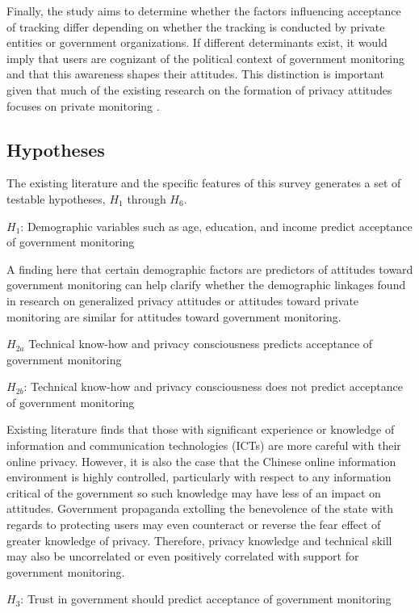 \documentclass[
  number]{elsarticle}
\begin{document}
Finally, the study aims to determine whether the factors influencing
acceptance of tracking differ depending on whether the tracking is
conducted by private entities or government organizations. If different
determinants exist, it would imply that users are cognizant of the
political context of government monitoring and that this awareness
shapes their attitudes. This distinction is important given that much of
the existing research on the formation of privacy attitudes focuses on
private monitoring \citep{gómez-barroso2018}.

\subsection{Hypotheses}\label{hypotheses}

The existing literature and the specific features of this survey
generates a set of testable hypotheses, \(H_1\) through \(H_6\).

\(H_1\): Demographic variables such as age, education, and income
predict acceptance of government monitoring

A finding here that certain demographic factors are predictors of
attitudes toward government monitoring can help clarify whether the
demographic linkages found in research on generalized privacy attitudes
or attitudes toward private monitoring are similar for attitudes toward
government monitoring.

\(H_{2a}\) Technical know-how and privacy consciousness predicts
acceptance of government monitoring

\(H_{2b}\): Technical know-how and privacy consciousness does not
predict acceptance of government monitoring

Existing literature finds that those with significant experience or
knowledge of information and communication technologies (ICTs) are more
careful with their online privacy. However, it is also the case that the
Chinese online information environment is highly controlled,
particularly with respect to any information critical of the government
\citep{han2018} so such knowledge may have less of an impact on
attitudes. Government propaganda extolling the benevolence of the state
with regards to protecting users \citep{gainous2023} may even counteract
or reverse the fear effect of greater knowledge of privacy. Therefore,
privacy knowledge and technical skill may also be uncorrelated or even
positively correlated with support for government monitoring.

\(H_3\): Trust in government should predict acceptance of government
monitoring
\end{document}
